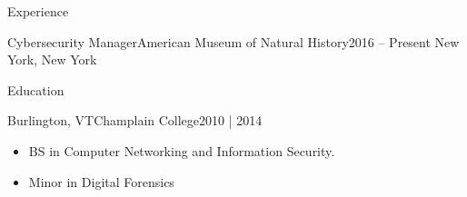 \documentclass[]{mcdowellcv}
\begin{document}
\makeheader
      

\begin{cvsection}{Experience}
	\begin{cvsubsection}{Cybersecurity Manager}{American Museum of Natural History}{2016 -- Present}
		New York, New York
		  
	\end{cvsubsection}
\end{cvsection}
\begin{cvsection}{Education}
	\begin{cvsubsection}{Burlington, VT}{Champlain College}{2010 | 2014}
		\begin{itemize}
			\item BS in Computer Networking and Information Security.
			\item Minor in Digital Forensics
		\end{itemize}
	\end{cvsubsection}
\end{cvsection}



\ 
\end{document}
